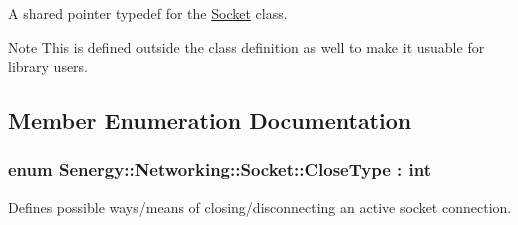 A shared pointer typedef for the \hyperlink{class_senergy_1_1_networking_1_1_socket}{Socket} class. 

\begin{DoxyNote}{Note}
This is defined outside the class definition as well to make it usuable for library users. 
\end{DoxyNote}


\subsection{Member Enumeration Documentation}
\hypertarget{class_senergy_1_1_networking_1_1_socket_a9a69a0d516b18e2a3bec77dc032b9993}{
\subsubsection[{Close\-Type}]{\setlength{\rightskip}{0pt plus 5cm}enum {\bf Senergy\-::\-Networking\-::\-Socket\-::\-Close\-Type} \-: int\hspace{0.3cm}{\ttfamily [strong]}}}\label{class_senergy_1_1_networking_1_1_socket_a9a69a0d516b18e2a3bec77dc032b9993}


Defines possible ways/means of closing/disconnecting an active socket connection. 


